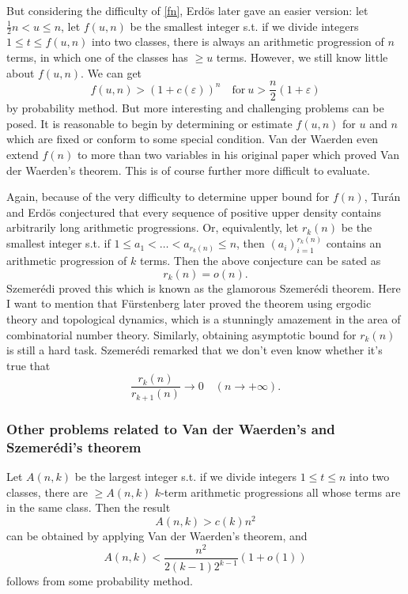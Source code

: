 \documentclass[12pt]{article}
\begin{document}
But considering the difficulty of \eqref{fn}, Erd\"{o}s later gave an easier version: let $\frac{1}{2}n < u \leq n$, let $f(u, n)$ be the smallest integer s.t. if we divide integers $1 \leq t \leq f(u, n)$ into two classes, there is always an arithmetic progression of $n$ terms, in which one of the classes has $\geq u$ terms. However, we still know little about $f(u, n)$. We can get 
\begin{equation}
f(u, n) > (1+c(\varepsilon))^n\quad \text{for}\ u > \frac{n}{2}(1+\varepsilon)
\end{equation}
by probability method. But more interesting and challenging problems can be posed. It is reasonable to begin by determining or estimate $f(u, n)$ for $u$ and $n$ which are fixed or conform to some special condition. Van der Waerden\cite{vanpaper} even extend $f(n)$ to more than two variables in his original paper which proved Van der Waerden's theorem. This is of course further more difficult to evaluate.

Again, because of the very difficulty to determine upper bound for $f(n)$, Tur\'{a}n and Erd\"{o}s\cite{erdosconj} conjectured that every sequence of positive upper density contains arbitrarily long arithmetic progressions. Or, equivalently, let $r_k(n)$ be the smallest integer s.t. if $1 \leq a_1 < \hdots < a_{r_k(n)} \leq n$, then $(a_i)_{i=1}^{r_k(n)}$ contains an arithmetic progression of $k$ terms. Then the above conjecture can be sated as 
\begin{equation}
r_k(n)=o(n).
\end{equation}
Szemer\'{e}di\cite{szpaper} proved this which is known as the glamorous Szemer\'{e}di theorem. Here I want to mention that F\"{u}rstenberg\cite{fur} later proved the theorem using ergodic theory and topological dynamics, which is a stunningly amazement in the area of combinatorial number theory. Similarly, obtaining asymptotic bound for $r_k(n)$ is still a hard task. Szemer\'{e}di remarked that we don't even know whether it's true that 
\begin{equation}
\frac{r_k(n)}{r_{k+1}(n)}\to 0 \quad (n \to +\infty).
\end{equation}

\subsubsection{Other problems related to Van der Waerden's and Szemer\'{e}di's theorem}

Let $A(n, k)$ be the largest integer s.t. if we divide integers $1 \leq t \leq n$ into two classes, there are $\geq A(n, k)$ $k$-term arithmetic progressions all whose terms are in the same class. Then the result 
\begin{equation}
A(n, k)>c(k)n^2
\end{equation}
can be obtained by applying Van der Waerden's theorem, and 
\begin{equation}
A(n, k) < \frac{n^2}{2(k-1)2^{k-1}}(1+o(1))
\end{equation}
follows from some probability method. 
\end{document}
